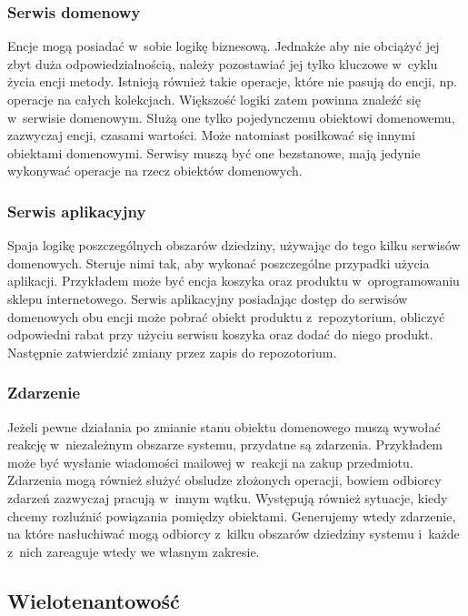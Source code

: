 \documentclass[a4paper]{book}
\begin{document}
{\subsubsection{Serwis domenowy}
Encje mogą posiadać w~sobie logikę biznesową. Jednakże aby nie obciążyć jej zbyt duża odpowiedzialnością, należy pozostawiać jej tylko kluczowe w~cyklu życia encji metody. Istnieją również takie operacje, które nie pasują do encji, np. operacje na całych kolekcjach. Większość logiki zatem powinna znaleźć się w~serwisie domenowym. Służą one tylko pojedynczemu obiektowi domenowemu, zazwyczaj encji, czasami wartości. Może natomiast posiłkować się innymi obiektami domenowymi. Serwisy muszą być one bezstanowe, mają jedynie wykonywać operacje na rzecz obiektów domenowych.

\subsubsection{Serwis aplikacyjny}
Spaja logikę poszczególnych obszarów dziedziny, używając do tego kilku serwisów domenowych. Steruje nimi tak, aby wykonać poszczególne przypadki użycia aplikacji. Przykładem może być encja koszyka oraz produktu w~oprogramowaniu sklepu internetowego. Serwis aplikacyjny posiadając dostęp do serwisów domenowych obu encji może pobrać obiekt produktu z~repozytorium, obliczyć odpowiedni rabat przy użyciu serwisu koszyka oraz dodać do niego produkt. Następnie zatwierdzić zmiany przez zapis do repozotorium.

\subsubsection{Zdarzenie}
Jeżeli pewne działania po zmianie stanu obiektu domenowego muszą wywołać reakcję w~niezależnym obszarze systemu, przydatne są zdarzenia. Przykładem może być wysłanie wiadomości mailowej w~reakcji na zakup przedmiotu. Zdarzenia mogą również służyć obsludze złożonych operacji, bowiem odbiorcy zdarzeń zazwyczaj pracują w~innym wątku. Występują również sytuacje, kiedy chcemy rozluźnić powiązania pomiędzy obiektami. Generujemy wtedy zdarzenie, na które nasłuchiwać mogą odbiorcy z~kilku obszarów dziedziny systemu i~każde z~nich zareaguje wtedy we własnym zakresie. 

\subsection{Wielotenantowość}
\label{architekturaMultitenant}

}
\end{document}

